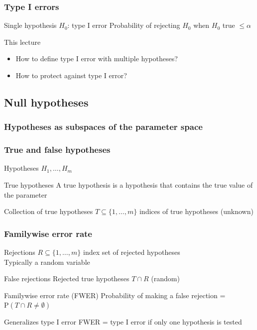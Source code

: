 \documentclass[compress]{beamer}
\newcommand{\bb}[1]{\begin{block}{#1}}
\newcommand{\eb}{\end{block}}
\newcommand{\bi}{\begin {itemize}}
\newcommand{\ei}{\end{itemize}}
\newcommand{\bfr}[1]{\begin{frame} \frametitle{#1}}
\begin{document}
\bfr{Type I errors}
  \bb{Single hypothesis $H_0$: type I error}
    Probability of rejecting $H_0$ when $H_0$ true $\leq \alpha$
  \eb
  \bb{This lecture}
    \bi
      \item How to define type I error with multiple hypotheses?
      \item How to protect against type I error?
    \ei
  \eb
\end{frame}



\subsection{Null hypotheses}

\bfr{Hypotheses as subspaces of the parameter space}
\centering
{}
\end{frame}


\bfr{True and false hypotheses}
  \bb{Hypotheses}
    $H_1,\ldots,H_m$
  \eb
  \bb{True hypotheses}
    A true hypothesis is a hypothesis that contains the true value of the parameter
  \eb
  \bb{Collection of true hypotheses}
    $T \subseteq \{1,\ldots,m\}$ indices of true hypotheses (unknown)
  \eb
\end{frame}



\bfr{Familywise error rate}
  \bb{Rejections}
    $R \subseteq \{1,\ldots,m\}$ index set of rejected hypotheses
    \\ Typically a random variable
  \eb
  \bb{False rejections}
    Rejected true hypotheses $T \cap R$ (random)
  \eb
  \bb{Familywise error rate (FWER)}
    Probability of making a false rejection = $\mathrm{P}(T \cap R \neq \emptyset)$
  \eb
  \bb{Generalizes type I error}
    FWER = type I error if only one hypothesis is tested
  \eb
\end{frame}
\end{document}
